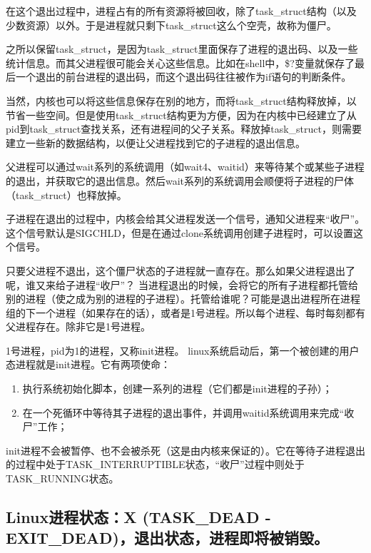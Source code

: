 \documentclass[doctor,openright,twoside]{sjtuthesis}
\providecommand{\tightlist}{%
    \setlength{\itemsep}{0pt}\setlength{\parskip}{0pt}}
\theoremstyle{plain}
\theoremstyle{definition}
\theoremstyle{remark}
\theoremstyle{ocrenumbox}
\theoremstyle{plain}
\begin{document}
在这个退出过程中，进程占有的所有资源将被回收，除了task\_struct结构（以及少数资源）以外。于是进程就只剩下task\_struct这么个空壳，故称为僵尸。

之所以保留task\_struct，是因为task\_struct里面保存了进程的退出码、以及一些统计信息。而其父进程很可能会关心这些信息。比如在shell中，\$?变量就保存了最后一个退出的前台进程的退出码，而这个退出码往往被作为if语句的判断条件。

当然，内核也可以将这些信息保存在别的地方，而将task\_struct结构释放掉，以节省一些空间。但是使用task\_struct结构更为方便，因为在内核中已经建立了从pid到task\_struct查找关系，还有进程间的父子关系。释放掉task\_struct，则需要建立一些新的数据结构，以便让父进程找到它的子进程的退出信息。

父进程可以通过wait系列的系统调用（如wait4、waitid）来等待某个或某些子进程的退出，并获取它的退出信息。然后wait系列的系统调用会顺便将子进程的尸体（task\_struct）也释放掉。

子进程在退出的过程中，内核会给其父进程发送一个信号，通知父进程来``收尸''。这个信号默认是SIGCHLD，但是在通过clone系统调用创建子进程时，可以设置这个信号。

只要父进程不退出，这个僵尸状态的子进程就一直存在。那么如果父进程退出了呢，谁又来给子进程``收尸''？
当进程退出的时候，会将它的所有子进程都托管给别的进程（使之成为别的进程的子进程）。托管给谁呢？可能是退出进程所在进程组的下一个进程（如果存在的话），或者是1号进程。所以每个进程、每时每刻都有父进程存在。除非它是1号进程。

1号进程，pid为1的进程，又称init进程。
linux系统启动后，第一个被创建的用户态进程就是init进程。它有两项使命：

\begin{enumerate}
\def\labelenumi{\arabic{enumi}.}
\tightlist
\item
  执行系统初始化脚本，创建一系列的进程（它们都是init进程的子孙）；
\item
  在一个死循环中等待其子进程的退出事件，并调用waitid系统调用来完成``收尸''工作；
\end{enumerate}

init进程不会被暂停、也不会被杀死（这是由内核来保证的）。它在等待子进程退出的过程中处于TASK\_INTERRUPTIBLE状态，``收尸''过程中则处于TASK\_RUNNING状态。

\hypertarget{linuxx-task_dead---exit_dead}{%
\subsection{Linux进程状态：X (TASK\_DEAD - EXIT\_DEAD)，退出状态，进程即将被销毁。}\label{linuxx-task_dead---exit_dead}}
\end{document}

